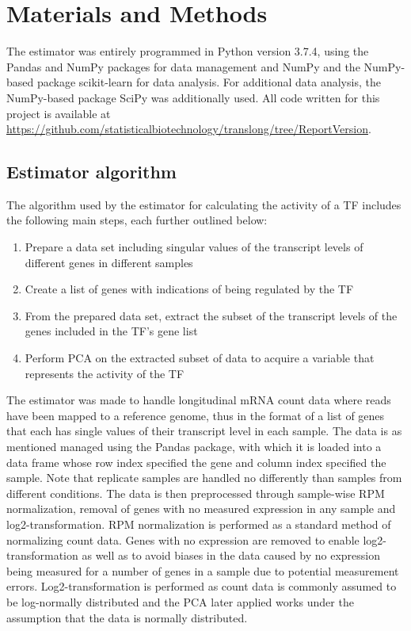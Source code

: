 \chapter{Materials and Methods}
\vspace{-0.75cm}

The estimator was entirely programmed in Python version 3.7.4, using the Pandas \cite{mckinney-proc-scipy-2010} and NumPy \cite{van2011numpy, oliphant2006guide} packages for data management and NumPy and the NumPy-based package scikit-learn \cite{scikit-learn} for data analysis. For additional data analysis, the NumPy-based package SciPy \cite{SciPy}  was additionally used. All code written for this project is available at \url{https://github.com/statisticalbiotechnology/translong/tree/ReportVersion}.

\section{Estimator algorithm}

 The algorithm used by the estimator for calculating the activity of a \ac{TF} includes the following main steps, each further outlined below:
\begin{enumerate}
    \item Prepare a data set including singular values of the transcript levels of different genes in different samples
    \item Create a list of genes with indications of being regulated by the \ac{TF}
    \item From the prepared data set, extract the subset of the transcript levels of the genes included in the \ac{TF}'s gene list
    \item Perform \ac{PCA} on the extracted subset of data to acquire a variable that represents the activity of the \ac{TF}
\end{enumerate}

\noindent The estimator was made to handle longitudinal mRNA count data where reads have been mapped to a reference genome, thus in the format of a list of genes that each has single values of their transcript level in each sample. The data is as mentioned managed using the Pandas package, with which it is loaded into a data frame whose row index specified the gene and column index specified the sample. Note that replicate samples are  handled no differently than samples from different conditions. The data is then preprocessed through sample-wise \ac{RPM} normalization, removal of genes with no measured expression in any sample and log2-transformation. \ac{RPM} normalization is performed as a standard method of normalizing count data. Genes with no expression are removed to enable log2-transformation as well as to avoid biases in the data caused by no expression being measured for a number of genes in a sample due to potential measurement errors. Log2-transformation is performed as count data is commonly assumed to be log-normally distributed and the \ac{PCA} later applied works under the assumption that the data is normally distributed.

